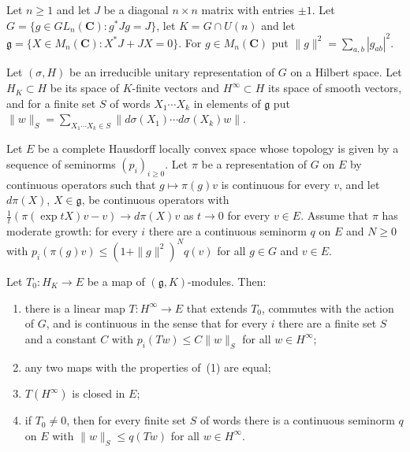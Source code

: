 \begin{theorem}\label{lit-casselman-wallach}
Let $n\ge1$ and let $J$ be a diagonal $n\times n$ matrix with entries $\pm1$.
Let $G=\{g\in GL_n(\mathbf C):g^*Jg=J\}$, let $K=G\cap U(n)$ and let
$\mathfrak g=\{X\in M_n(\mathbf C):X^*J+JX=0\}$. For $g\in M_n(\mathbf C)$
put $\|g\|^2=\sum_{a,b}|g_{ab}|^2$.

Let $(\sigma,H)$ be an irreducible unitary representation of $G$ on a Hilbert
space. Let $H_K\subset H$ be its space of $K$-finite vectors and
$H^\infty\subset H$ its space of smooth vectors, and for a finite set $S$ of
words $X_1\cdots X_k$ in elements of $\mathfrak g$ put
$\|w\|_S=\sum_{X_1\cdots X_k\in S}\|d\sigma(X_1)\cdots d\sigma(X_k)w\|$.

Let $E$ be a complete Hausdorff locally convex space whose topology is given
by a sequence of seminorms $(p_i)_{i\ge0}$. Let $\pi$ be a representation of
$G$ on $E$ by continuous operators such that $g\mapsto\pi(g)v$ is continuous
for every $v$, and let $d\pi(X)$, $X\in\mathfrak g$, be continuous operators
with $\frac1t(\pi(\exp tX)v-v)\to d\pi(X)v$ as $t\to0$ for every $v\in E$.
Assume that $\pi$ has moderate growth: for every $i$ there are a continuous
seminorm $q$ on $E$ and $N\ge0$ with
$p_i(\pi(g)v)\le(1+\|g\|^2)^Nq(v)$ for all $g\in G$ and $v\in E$.

Let $T_0:H_K\to E$ be a map of $(\mathfrak g,K)$-modules. Then:
\begin{enumerate}
\item there is a linear map $T:H^\infty\to E$ that extends $T_0$, commutes
  with the action of $G$, and is continuous in the sense that for every $i$
  there are a finite set $S$ and a constant $C$ with
  $p_i(Tw)\le C\|w\|_S$ for all $w\in H^\infty$;
\item any two maps with the properties of~(1) are equal;
\item $T(H^\infty)$ is closed in $E$;
\item if $T_0\neq0$, then for every finite set $S$ of words there is a
  continuous seminorm $q$ on $E$ with $\|w\|_S\le q(Tw)$ for all
  $w\in H^\infty$.
\end{enumerate}
\end{theorem}

